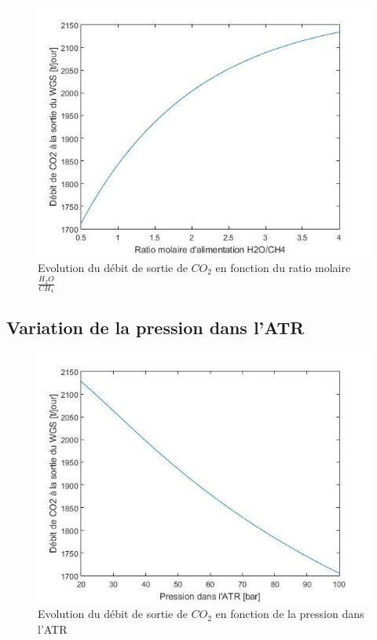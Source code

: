 \documentclass[12pt]{report}
\begin{document}
\begin{figure}[H]
\begin{center}
\includegraphics[scale=0.6]{debit_CO2_ratio_H2O}
\caption{Evolution du débit de sortie de $CO_2$ en fonction du ratio molaire $\frac{H_2O}{CH_4}$}
\end{center}
\end{figure}

\subsection{Variation de la pression dans l'ATR}

\begin{figure}[H]
\begin{center}
\includegraphics[scale=0.6]{debit_CO2_pression_ATR}
\caption{Evolution du débit de sortie de $CO_2$ en fonction de la pression dans l'ATR}
\end{center}
\end{figure}
\end{document}
